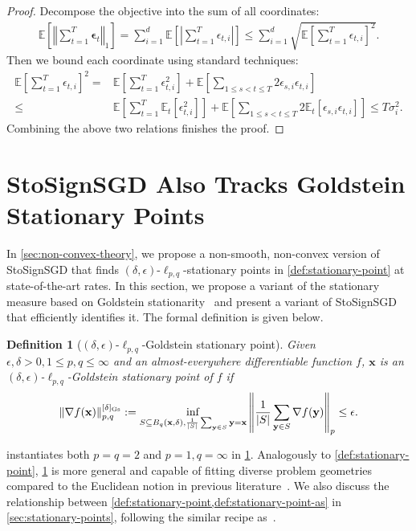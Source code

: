 \documentclass{article}
\newtheorem{defn}{Definition}
\def \y {\mathbf{y}}
\def \E {\mathbb{E}}
\def \x {\mathbf{x}}
\newcommand{\norm}[1]{\left\Vert#1\right\Vert}
\newcommand{\abs}[1]{\left|#1\right|}
\def \eps {\bm{\epsilon}}
\newcommand{\sqbrac}[1]{\left[#1\right]}
\begin{document}
\begin{proof}
    Decompose the objective into the sum of all coordinates:
    \begin{align*}
         \E\sqbrac{\norm{\sum_{t=1}^T\eps_t}_1}=\sum_{i=1}^d\E\sqbrac{\abs{\sum_{t=1}^T\epsilon_{t,i}}}\le\sum_{i=1}^d\sqrt{\E\sqbrac{\sum_{t=1}^T\epsilon_{t,i}}^2}.
    \end{align*}
    Then we bound each coordinate using standard techniques:
    \begin{align*}
        \E\sqbrac{\sum_{t=1}^T\epsilon_{t,i}}^2=&\E\sqbrac{\sum_{t=1}^T\epsilon_{t,i}^2}+\E\sqbrac{\sum_{1\le s<t\le T}2\epsilon_{s,i}\epsilon_{t,i}} \\\le& \E\sqbrac{\sum_{t=1}^T\E_t\sqbrac{\epsilon_{t,i}^2}}+\E\sqbrac{\sum_{1\le s<t\le T}2\E_t\sqbrac{\epsilon_{s,i}\epsilon_{t,i}}}\le T\sigma_i^2.       
    \end{align*}
    Combining the above two relations finishes the proof.
\end{proof}

\section{StoSignSGD Also Tracks Goldstein Stationary Points\label{sec:goldstein}}

In \cref{sec:non-convex-theory}, we propose a non-smooth, non-convex version of StoSignSGD that finds $(\delta,\epsilon)$-$\ell_{p,q}$-stationary points in \cref{def:stationary-point} at state-of-the-art rates. In this section, we propose a variant of the stationary measure based on Goldstein stationarity~\citep{goldstein1977optimization} and present a variant of StoSignSGD that efficiently identifies it. The formal definition is given below.

\begin{defn}[$(\delta,\epsilon)$-$\ell_{p,q}$-Goldstein stationary point]\label{def:stationary-point-as}
Given $\epsilon,\delta> 0,1\le p,q\le\infty$ and an almost-everywhere differentiable function $f$, $\x$ is an $(\delta,\epsilon)$-$\ell_{p,q}$-Goldstein stationary point of $f$ if
    \begin{align*}
        \norm{\nabla f(\x)}_{p,q}^{[\delta]_{\textnormal{Gs}}}:=\inf_{S\subseteq B_q(\x,\delta),\frac{1}{\abs{S}}\sum_{\y\in S}\y=\x}\norm{\frac{1}{\abs{S}}\sum_{\y\in S}\nabla f(\y)}_p\le\epsilon.
    \end{align*}
\end{defn}

\citet[Definition~12]{cutkosky2023optimal} instantiates both $p=q=2$ and $p=1,q=\infty$ in \cref{def:stationary-point-as}. Analogously to \cref{def:stationary-point}, \cref{def:stationary-point-as} is more general and capable of fitting diverse problem geometries compared to the Euclidean notion in previous literature~\citep[Definition~12]{cutkosky2023optimal}. We also discuss the relationship between \cref{def:stationary-point,def:stationary-point-as} in \cref{sec:stationary-points}, following the similar recipe as~\citet{zhang2026random}.
\end{document}
